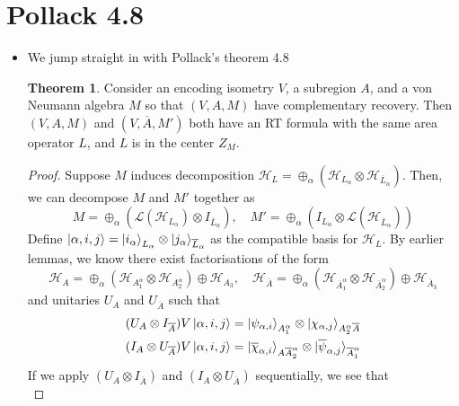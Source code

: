 \documentclass[12pt,a4paper]{article}
\numberwithin{equation}{section}
\newcommand{\ol}[1]{\overline{#1}}
\theoremstyle{definition}
\theoremstyle{theorem}
\newtheorem{theorem}{Theorem}[section]
\theoremstyle{example}
\begin{document}
	\section{Pollack 4.8}
	\begin{itemize}
		\item We jump straight in with Pollack's theorem 4.8
		\begin{theorem}
			Consider an encoding isometry $V$, a subregion $A$, and a von Neumann algebra $M$ so that $(V,A,M)$ have complementary recovery. Then $(V,A,M)$ and $(V,\ol{A},M')$ both have an RT formula with the same area operator $L$, and $L$ is in the center $Z_{M}$.
		\end{theorem}
		\begin{proof}
			Suppose $M$ induces decomposition $\mathcal{H}_{L}=\oplus_{\alpha}(\mathcal{H}_{L_{\alpha}}\otimes\mathcal{H}_{\ol{L}_{\alpha}})$. Then, we can decompose $M$ and $M'$ together as
			\begin{equation}
				M=\oplus_{\alpha}(\mathcal{L}(\mathcal{H}_{L_{\alpha}})\otimes I_{\ol{L}_{\alpha}}),\quad M'=\oplus_{\alpha}(I_{L_{\alpha}}\otimes\mathcal{L}(\mathcal{H}_{\ol{L}_{\alpha}}))
			\end{equation}
			Define $\ket{\alpha,i,j}=\ket{i_{\alpha}}_{L_{\alpha}}\otimes\ket{j_{\alpha}}_{\ol{L}_{\alpha}}$ as the compatible basis for $\mathcal{H}_{L}$. By earlier lemmas, we know there exist factorisations of the form
			\begin{equation}
				\mathcal{H}_{A}=\oplus_{\alpha}(\mathcal{H}_{A_{1}^{\alpha}}\otimes\mathcal{H}_{A_{2}^{\alpha}})\oplus\mathcal{H}_{A_{3}},\quad\mathcal{H}_{\ol{A}}=\oplus_{\alpha}(\mathcal{H}_{\ol{A}_{1}^{\alpha}}\otimes\mathcal{H}_{\ol{A}_{2}^{\alpha}})\oplus\mathcal{H}_{\ol{A}_{3}}
			\end{equation}
			and unitaries $U_{A}$ and $U_{\ol{A}}$ such that
			\begin{equation}
				\begin{aligned}
					(U_{A}\otimes I_{\ol{A}})V\ket{\alpha,i,j}&=\ket{\psi_{\alpha,i}}_{A_{1}^{\alpha}}\otimes\ket{\chi_{\alpha,j}}_{A_{2}^{\alpha}\ol{A}}\\
					(I_{A}\otimes U_{\ol{A}})V\ket{\alpha,i,j}&=\ket{\ol{\chi}_{\alpha,i}}_{A\ol{A}_{2}^{\alpha}}\otimes\ket{\ol{\psi}_{\alpha,j}}_{\ol{A}_{1}^{\alpha}}
				\end{aligned}
			\end{equation}
			If we apply $(U_{A}\otimes I_{\ol{A}})$ and $(I_{A}\otimes U_{\ol{A}})$ sequentially, we see that
			\begin{equation}

\end{equation}
\end{proof}
\end{itemize}
\end{document}
